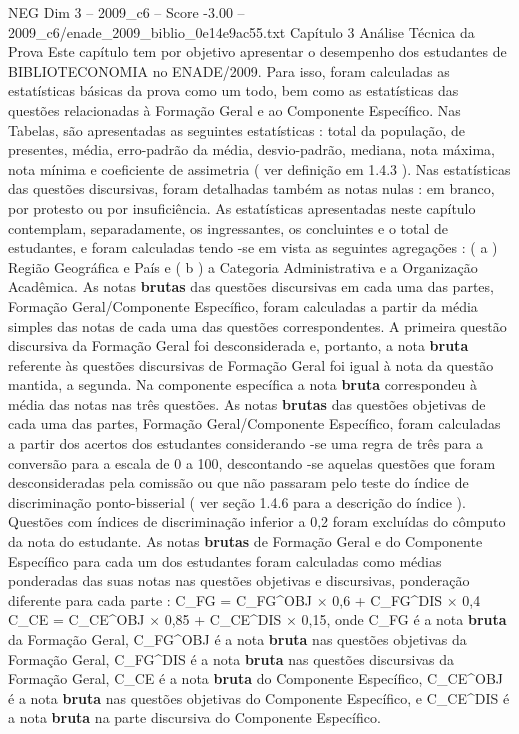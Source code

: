 \begin{textsample}{NEG Dim 3 – 2009\_c6 – Score -3.00 – 2009\_c6/enade\_2009\_biblio\_0e14e9ac55.txt}  \label{ex:f3_neg_046}
Capítulo 3 Análise Técnica da Prova Este capítulo tem por objetivo apresentar o desempenho dos estudantes de BIBLIOTECONOMIA no ENADE/2009.
Para isso, foram calculadas as estatísticas básicas da prova como um todo, bem como as estatísticas das questões relacionadas à Formação Geral e ao Componente Específico.
Nas Tabelas, são apresentadas as seguintes estatísticas : total da população, de presentes, média, erro-padrão da média, desvio-padrão, mediana, nota máxima, nota mínima e coeficiente de assimetria ( ver definição em 1.4.3 ).
Nas estatísticas das questões discursivas, foram detalhadas também as notas nulas : em branco, por protesto ou por insuficiência.
As estatísticas apresentadas neste capítulo contemplam, separadamente, os ingressantes, os concluintes e o total de estudantes, e foram calculadas tendo -se em vista as seguintes agregações : ( a ) Região Geográfica e País e ( b ) a Categoria Administrativa e a Organização Acadêmica.
As notas \textbf{brutas} das questões discursivas em cada uma das partes, Formação Geral/Componente Específico, foram calculadas a partir da média simples das notas de cada uma das questões correspondentes.
A primeira questão discursiva da Formação Geral foi desconsiderada e, portanto, a nota \textbf{bruta} referente às questões discursivas de Formação Geral foi igual à nota da questão mantida, a segunda.
Na componente específica a nota \textbf{bruta} correspondeu à média das notas nas três questões.
As notas \textbf{brutas} das questões objetivas de cada uma das partes, Formação Geral/Componente Específico, foram calculadas a partir dos acertos dos estudantes considerando -se uma regra de três para a conversão para a escala de 0 a 100, descontando -se aquelas questões que foram desconsideradas pela comissão ou que não passaram pelo teste do índice de discriminação ponto-bisserial ( ver seção 1.4.6 para a descrição do índice ).
Questões com índices de discriminação inferior a 0,2 foram excluídas do cômputo da nota do estudante.
As notas \textbf{brutas} de Formação Geral e do Componente Específico para cada um dos estudantes foram calculadas como médias ponderadas das suas notas nas questões objetivas e discursivas, ponderação diferente para cada parte : C\_FG = C\_FG\textasciicircum{}OBJ × 0,6 + C\_FG\textasciicircum{}DIS × 0,4 C\_CE = C\_CE\textasciicircum{}OBJ × 0,85 + C\_CE\textasciicircum{}DIS × 0,15, onde C\_FG é a nota \textbf{bruta} da Formação Geral, C\_FG\textasciicircum{}OBJ é a nota \textbf{bruta} nas questões objetivas da Formação Geral, C\_FG\textasciicircum{}DIS é a nota \textbf{bruta} nas questões discursivas da Formação Geral, C\_CE é a nota \textbf{bruta} do Componente Específico, C\_CE\textasciicircum{}OBJ é a nota \textbf{bruta} nas questões objetivas do Componente Específico, e C\_CE\textasciicircum{}DIS é a nota \textbf{bruta} na parte discursiva do Componente Específico.

\end{textsample}
